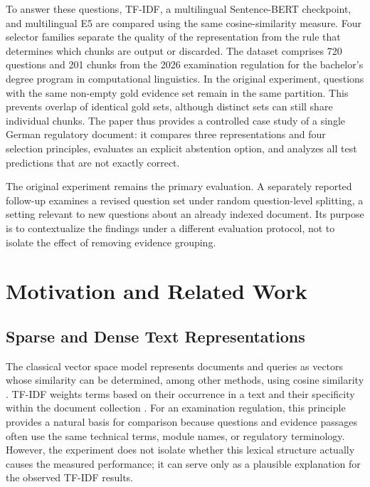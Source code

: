 \documentclass[11pt]{article}
\newcommand{\revision}[1]{#1}
\begin{document}
To answer these questions, TF-IDF, a multilingual Sentence-BERT checkpoint, and multilingual E5 are compared using the same cosine-similarity measure. Four selector families separate the quality of the representation from the rule that determines which chunks are output or discarded. The dataset comprises 720 questions and 201 chunks from the 2026 examination regulation for the bachelor's degree program in computational linguistics. \revision{In the original experiment, questions with the same non-empty gold evidence set remain in the same partition. This prevents overlap of identical gold sets, although distinct sets can still share individual chunks.} The paper thus provides a controlled case study of a single German regulatory document: it compares three representations and four selection principles, evaluates an explicit abstention option, and analyzes all test predictions that are not exactly correct.

\revision{The original experiment remains the primary evaluation. A separately reported follow-up examines a revised question set under random question-level splitting, a setting relevant to new questions about an already indexed document. Its purpose is to contextualize the findings under a different evaluation protocol, not to isolate the effect of removing evidence grouping.}


\section{Motivation and Related Work}

\subsection{Sparse and Dense Text Representations}

The classical vector space model represents documents and queries as vectors whose similarity can be determined, among other methods, using cosine similarity \citep{salton1975vector}. TF-IDF weights terms based on their occurrence in a text and their specificity within the document collection \citep{sparckjones1972statistical}. For an examination regulation, this principle provides a natural basis for comparison because questions and evidence passages often use the same technical terms, module names, or regulatory terminology. However, the experiment does not isolate whether this lexical structure actually causes the measured performance; it can serve only as a plausible explanation for the observed TF-IDF results.
\end{document}
